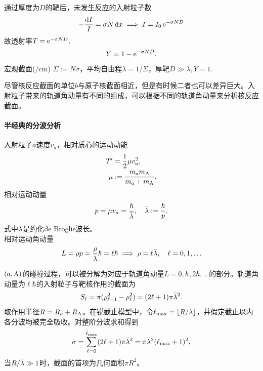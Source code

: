 通过厚度为$D$的靶后，未发生反应的入射粒子数
\begin{equation}\label{eq:nrd-beam-transmission}
	- \frac{\mathop{}\!\mathrm{d} I}{I} = \sigma N\mathop{}\!\mathrm{d} x \implies I = I_0\mathop{}\!\mathrm{e}^{-\sigma ND}
\end{equation}
故透射率$T = \mathop{}\!\mathrm{e}^{-\sigma ND},$
\begin{align}
	Y = 1 - \mathop{}\!\mathrm{e}^{-\sigma ND}.
\end{align}
宏观截面($\unit{\per\centi\metre}$) $\Sigma := N\sigma$，平均自由程$\lambda = 1/\Sigma$，厚靶$D \gg \lambda,Y = 1.$

尽管核反应截面的单位$\unit{b}$与原子核截面相近，但是有时候二者也可以差异巨大。入射粒子带来的轨道角动量有不同的组成，可以根据不同的轨道角动量来分析核反应截面。

\paragraph{半经典的分波分析}入射粒子$a$速度$v_a$，相对质心的运动动能
\begin{subequations}\label{eq:nrd-reduced-mass-energy}
	\begin{align}
		T' &= \frac12\mu v_a^2,\\
		\mu &:= \frac{m_am_{\mathrm{A}}}{m_a + m_{\mathrm{A}}}.
	\end{align}
\end{subequations}
相对运动动量
\[
	p = \mu v_a = \frac\hbar{\bar{\lambda}},\quad\bar{\lambda} := \frac\hbar{p}.
\]
式中$\bar{\lambda}$是约化de Broglie波长。\\
相对运动角动量
\[
	L = \rho p = \frac\rho{\bar{\lambda}}\hbar = \ell\hbar \implies \rho = \ell\bar{\lambda},\quad\ell = 0,1,\ldots
\]%

$(a,\mathrm{A})$的碰撞过程，可以被分解为对应于轨道角动量$L = 0,\hbar,2\hbar,\ldots$的部分。轨道角动量为$\ell\hbar$的入射粒子与靶核作用的截面为
\[
	S_\ell = \pi(\rho_{\ell+1}^2 - \rho_\ell^2) = (2\ell + 1)\pi\bar{\lambda}^2.
\]
取作用半径$R = R_a + R_{\mathrm{A}}$。在锐截止模型中，令$\ell_{\max} = \lfloor R/\bar{\lambda}\rfloor$，并假定截止以内各分波均被完全吸收。对整阶分波求和得到
\begin{align}
	\sigma = \sum_{\ell=0}^{\ell_{\max}}(2\ell + 1)\pi\bar{\lambda}^2 = \pi\bar{\lambda}^2(\ell_{\max} + 1)^2,
\end{align}
当$R/\bar{\lambda} \gg 1$时，截面的首项为几何面积$\pi R^2$。
